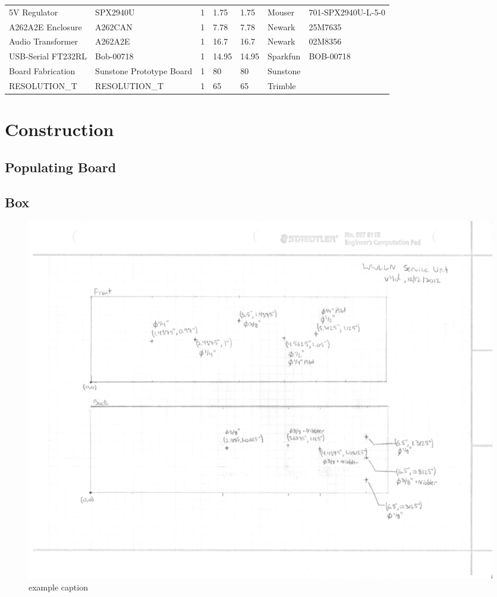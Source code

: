\begin{landscape}
\begin{center}
\begin{longtable}{|p{2in}|p{1.5in}|p{.75in}|p{.5in}|p{.5in}|p{1in}|p{1.5in}|}
5V Regulator & SPX2940U & 1 & 1.75 & 1.75 & Mouser & 701-SPX2940U-L-5-0\\ 
A262A2E Enclosure & A262CAN & 1 & 7.78 & 7.78 & Newark & 25M7635\\ 
Audio Transformer & A262A2E & 1 & 16.7 & 16.7 & Newark & 02M8356\\ 
USB-Serial FT232RL & Bob-00718 & 1 & 14.95 & 14.95 & Sparkfun & BOB-00718\\ 
Board Fabrication & Sunstone Prototype Board & 1 & 80 & 80 & Sunstone & \\ 
RESOLUTION\_T & RESOLUTION\_T & 1 & 65 & 65 & Trimble & 
\end{longtable}
\end{center}
\end{landscape}

\section{Construction}

\subsection{Populating Board}

\subsection{Box}

\begin{figure}[ht!]
   \centering
   \includegraphics[scale=1]{Appendix/Figures/su_box_holes_sides.pdf} 
   \caption{example caption}
   \label{example}
\end{figure}

